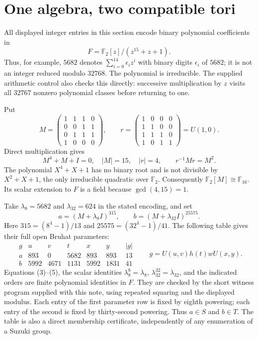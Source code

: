 \documentclass[11pt,a4paper]{article}
\newcommand{\F}{\mathbb F}
\begin{document}
\section{One algebra, two compatible tori}
All displayed integer entries in this section encode binary polynomial
coefficients in
\[
                       F=\F_2[z]/(z^{15}+z+1).
\]
Thus, for example, $5682$ denotes
$\sum_{i=0}^{14}\epsilon_i z^i$ with binary digits $\epsilon_i$ of
$5682$; it is not an integer reduced modulo $32768$.
The polynomial is irreducible. The supplied arithmetic control also
checks this directly: successive multiplication by $z$ visits all
$32767$ nonzero polynomial classes before returning to one.

Put
\[
 M=\begin{pmatrix}1&1&1&0\\0&0&1&1\\0&1&1&1\\1&0&0&0\end{pmatrix},
 \qquad
 r=\begin{pmatrix}1&0&0&0\\1&1&0&0\\1&1&1&0\\1&0&1&1\end{pmatrix}
   =U(1,0).
\]
Direct multiplication gives
\[
 M^4+M+I=0,\quad |M|=15,\quad |r|=4,
 \qquad r^{-1}Mr=M^2.                                   \tag{3}
\]
The polynomial $X^4+X+1$ has no binary root and is not divisible by
$X^2+X+1$, the only irreducible quadratic over $\F_2$.
Consequently $\F_2[M]\cong\F_{16}$. Its scalar extension to $F$
is a field because $\gcd(4,15)=1$.

Take $\lambda_8=5682$ and $\lambda_{32}=624$ in the stated encoding,
and set
\[
 a=(M+\lambda_8 I)^{315},\qquad
 b=(M+\lambda_{32}I)^{25575}.                            \tag{4}
\]
Here $315=(8^4-1)/13$ and $25575=(32^4-1)/41$.
The following table gives their full open Bruhat parameters:
\[
\begin{array}{c|rrrrr|r}
 g&u&v&t&x&y&|g|\\\hline
 a&893&0&5682&893&893&13\\
 b&5992&4671&1131&5992&1831&41
\end{array}
\qquad g=U(u,v)h(t)wU(x,y).                              \tag{5}
\]
Equations (3)--(5), the scalar identities
$\lambda_8^8=\lambda_8$, $\lambda_{32}^{32}=\lambda_{32}$,
and the indicated orders are finite polynomial identities in $F$.
They are checked by the short witness program supplied with this note,
using repeated squaring and the displayed modulus. Each entry of the
first parameter row is fixed by eighth powering; each entry of the
second is fixed by thirty-second powering. Thus $a\in S$ and $b\in T$.
The table is also a direct membership certificate, independently of
any enumeration of a Suzuki group.
\end{document}
